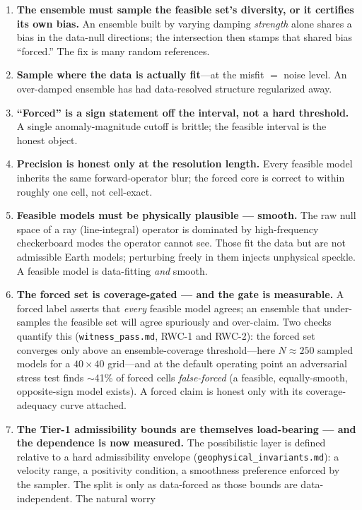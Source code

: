 \documentclass[11pt]{article}
\newcommand{\file}[1]{\texttt{#1}}
\begin{document}
\begin{enumerate}
\item \textbf{The ensemble must sample the feasible set's diversity, or it
  certifies its own bias.} An ensemble built by varying damping \emph{strength}
  alone shares a bias in the data-null directions; the intersection then stamps
  that shared bias ``forced.'' The fix is many random references.
\item \textbf{Sample where the data is actually fit}---at the
  misfit $=$ noise level. An over-damped ensemble has had data-resolved
  structure regularized away.
\item \textbf{``Forced'' is a sign statement off the interval, not a hard
  threshold.} A single anomaly-magnitude cutoff is brittle; the feasible
  interval is the honest object.
\item \textbf{Precision is honest only at the resolution length.} Every
  feasible model inherits the same forward-operator blur; the forced core is
  correct to within roughly one cell, not cell-exact.
\item \textbf{Feasible models must be physically plausible --- smooth.} The raw
  null space of a ray (line-integral) operator is dominated by high-frequency
  checkerboard modes the operator cannot see. Those fit the data but are not
  admissible Earth models; perturbing freely in them injects unphysical
  speckle. A feasible model is data-fitting \emph{and} smooth.
\item \textbf{The forced set is coverage-gated --- and the gate is
  measurable.} A forced label asserts that \emph{every} feasible model agrees;
  an ensemble that under-samples the feasible set will agree spuriously and
  over-claim. Two checks quantify this (\file{witness\_pass.md}, RWC-1 and
  RWC-2): the forced set converges only above an ensemble-coverage
  threshold---here $N \approx 250$ sampled models for a $40\times40$ grid---and
  at the default operating point an adversarial stress test finds $\sim$41\% of
  forced cells \emph{false-forced} (a feasible, equally-smooth, opposite-sign
  model exists). A forced claim is honest only with its coverage-adequacy curve
  attached.
\item \textbf{The Tier-1 admissibility bounds are themselves load-bearing
  --- and the dependence is now measured.} The possibilistic layer is defined
  relative to a hard admissibility envelope
  (\file{geophysical\_invariants.md}): a velocity range, a positivity
  condition, a smoothness preference enforced by the sampler. The split is
  only as data-forced as those bounds are data-independent. The natural worry

\end{enumerate}
\end{document}
